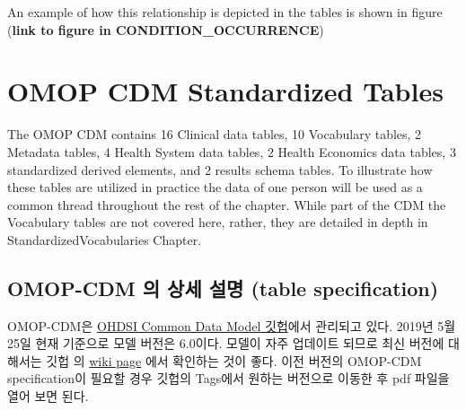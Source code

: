 \documentclass[]{book}
\begin{document}
An example of how this relationship is depicted in the tables is shown in figure (\textbf{link to figure in CONDITION\_OCCURRENCE})

\hypertarget{omop-cdm-standardized-tables}{%
\section{OMOP CDM Standardized Tables}\label{omop-cdm-standardized-tables}}

The OMOP CDM contains 16 Clinical data tables, 10 Vocabulary tables, 2 Metadata tables, 4 Health System data tables, 2 Health Economics data tables, 3 standardized derived elements, and 2 results schema tables. To illustrate how these tables are utilized in practice the data of one person will be used as a common thread throughout the rest of the chapter. While part of the CDM the Vocabulary tables are not covered here, rather, they are detailed in depth in StandardizedVocabularies Chapter.

\hypertarget{omop-cdm----table-specification}{%
\subsection{OMOP-CDM 의 상세 설명 (table specification)}\label{omop-cdm----table-specification}}

OMOP-CDM은 \href{https://github.com/ohdsi/commondatamodel}{OHDSI Common Data Model 깃헙}에서 관리되고 있다. 2019년 5월 25일 현재 기준으로 모델 버전은 6.0이다. 모델이 자주 업데이트 되므로 최신 버전에 대해서는 깃헙 의 \href{https://github.com/OHDSI/CommonDataModel/wiki}{wiki page} 에서 확인하는 것이 좋다. 이전 버전의 OMOP-CDM specification이 필요할 경우 깃헙의 Tags에서 원하는 버전으로 이동한 후 pdf 파일을 열어 보면 된다.
\end{document}
